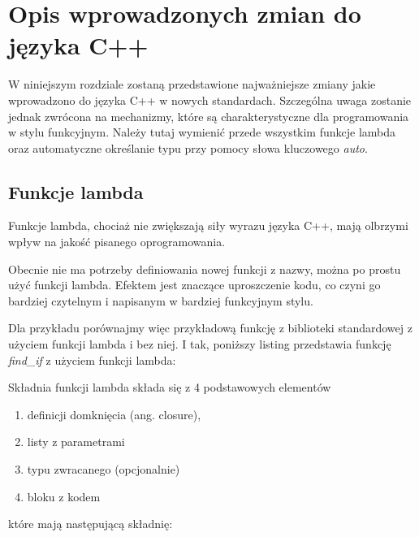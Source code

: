 \documentclass{pracamgr}
\begin{document}
\chapter{Opis wprowadzonych zmian do języka C++}\label{r:Zmiany}

W niniejszym rozdziale zostaną przedstawione najważniejsze zmiany jakie wprowadzono do języka C++ w nowych standardach. 
Szczególna uwaga zostanie jednak zwrócona na mechanizmy, które są charakterystyczne dla programowania w stylu funkcyjnym.
Należy tutaj wymienić przede wszystkim funkcje lambda oraz automatyczne określanie typu przy pomocy słowa kluczowego \textit{auto}.





\section{Funkcje lambda}

Funkcje lambda, chociaż nie zwiększają siły wyrazu języka C++, mają olbrzymi wpływ na jakość pisanego 
oprogramowania.

Obecnie nie ma potrzeby definiowania nowej funkcji z nazwy, można po prostu użyć funkcji lambda.
Efektem jest znaczące uproszczenie kodu, co czyni go bardziej czytelnym i napisanym w bardziej funkcyjnym stylu.
 
Dla przykładu porównajmy więc przykładową funkcję z biblioteki standardowej z użyciem funkcji lambda i bez niej.
I tak, poniższy listing przedstawia funkcję \textit{find\_if} z użyciem funkcji lambda: 


\noindent
Składnia funkcji lambda składa się z 4 podstawowych elementów
\begin{enumerate}
\item definicji domknięcia (ang. closure),
\item listy z parametrami
\item typu zwracanego (opcjonalnie)
\item bloku z kodem
\end{enumerate}

\noindent
które mają następującą składnię:
\end{document}
